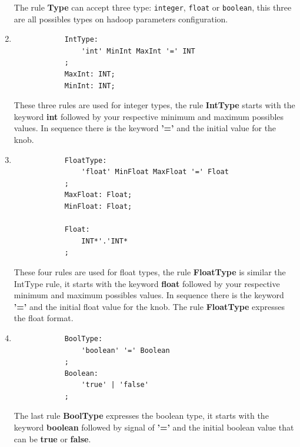 \begin{enumerate}
		The rule \textbf{Type} can accept three type: \texttt{integer}, \texttt{float} or \texttt{boolean},
		this three are all possibles types on hadoop parameters configuration.

	\item
		\singlespacing
		\begin{listing}[H]
		\begin{verbatim}
			IntType:
				'int' MinInt MaxInt '=' INT
			;
			MaxInt: INT;
			MinInt: INT;
		\end{verbatim}
		\label{listing:modelRule}
		\end{listing}

		These three rules are used for integer types, the rule \textbf{IntType}
		starts with the keyword {\bf int} followed by your respective minimum
		and maximum possibles values. In sequence there is the keyword {\bf '='}
		and the initial value for the knob.

	\item
		\singlespacing
		\begin{listing}[H]
		\begin{verbatim}
			FloatType:
				'float' MinFloat MaxFloat '=' Float
			;
			MaxFloat: Float;
			MinFloat: Float;

			Float:
				INT*'.'INT*
			;
		\end{verbatim}
		\label{listing:modelRule}
		\end{listing}

		These four rules are used for float types, the rule \textbf{FloatType} is
		similar the IntType rule, it starts with the keyword {\bf float} followed
		by your respective minimum and maximum possibles values. In sequence there
		is the keyword {\bf '='} and the initial float value for the knob. The rule
		{\bf FloatType} expresses the float format.

	\item
		\singlespacing
		\begin{listing}[H]
		\begin{verbatim}
			BoolType:
				'boolean' '=' Boolean
			;
			Boolean:
				'true' | 'false' 
			;
		\end{verbatim}
		\label{listing:modelRule}
		\end{listing}

		The last rule {\bf BoolType} expresses the boolean type, it starts with
		the keyword {\bf boolean} followed by signal of \textbf{'='} and the initial
		boolean	value that can be {\bf true} or {\bf false}.

\end{enumerate}

